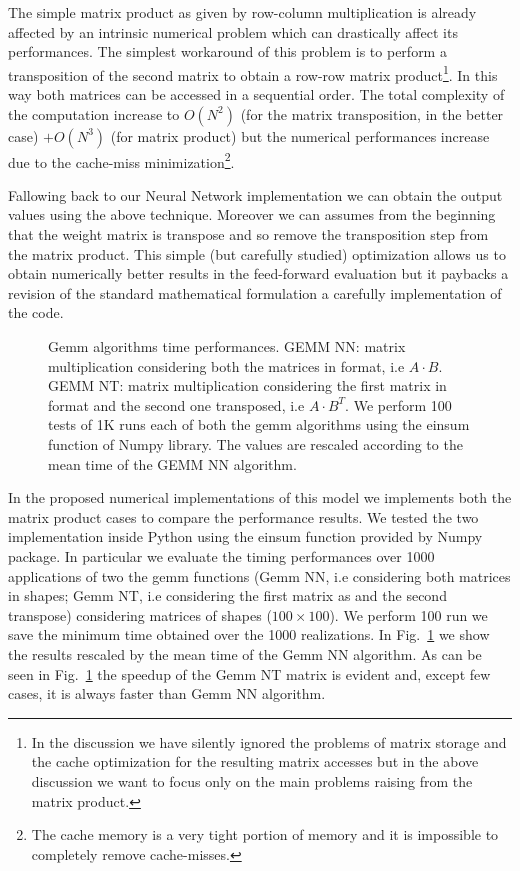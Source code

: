 \documentclass{standalone}
\begin{document}
The simple matrix product as given by row-column multiplication is already affected by an intrinsic numerical problem which can drastically affect its performances.
The simplest workaround of this problem is to perform a transposition of the second matrix to obtain a row-row matrix product\footnote{
  In the discussion we have silently ignored the problems of matrix storage and the cache optimization for the resulting matrix accesses but in the above discussion we want to focus only on the main problems raising from the matrix product.
}.
In this way both matrices can be accessed in a sequential order.
The total complexity of the computation increase to $O(N^2)$ (for the matrix transposition, in the better case) $+ O(N^3)$ (for matrix product) but the numerical performances increase due to the cache-miss minimization\footnote{
  The cache memory is a very tight portion of memory and it is impossible to completely remove cache-misses.
}.

Fallowing back to our Neural Network implementation we can obtain the output values using the above technique.
Moreover we can assumes from the beginning that the weight matrix is transpose and so remove the transposition step from the matrix product.
This simple (but carefully studied) optimization allows us to obtain numerically better results in the feed-forward evaluation but it paybacks a revision of the standard mathematical formulation a carefully implementation of the code.

\begin{figure}[htbp]
\centering
\def\svgwidth{0.5\textwidth}

\caption{Gemm algorithms time performances.
GEMM NN: matrix multiplication considering both the matrices in  format, i.e $A\cdot B$.
GEMM NT: matrix multiplication considering the first matrix in  format and the second one transposed, i.e $A\cdot B^T$.
We perform 100 tests of 1K runs each of both the gemm algorithms using the \textsf{einsum} function of Numpy library.
The values are rescaled according to the mean time of the GEMM NN algorithm.
}
\label{fig:gemm}
\end{figure}

In the proposed numerical implementations of this model we implements both the matrix product cases to compare the performance results.
We tested the two implementation inside Python using the \textsf{einsum} function provided by Numpy package.
In particular we evaluate the timing performances over 1000 applications of two the gemm functions (Gemm NN, i.e considering both matrices in  shapes; Gemm NT, i.e considering the first matrix as  and the second transpose) considering matrices of shapes ($100\times100$).
We perform 100 run we save the minimum time obtained over the 1000 realizations.
In Fig.~\ref{fig:gemm} we show the results rescaled by the mean time of the Gemm NN algorithm.
As can be seen in Fig.~\ref{fig:gemm} the speedup of the Gemm NT matrix is evident and, except few cases, it is always faster than Gemm NN algorithm.
\end{document}
